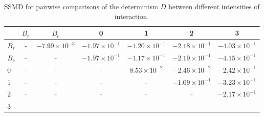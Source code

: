 \begin{table}
\centering
\caption{SSMD for pairwise comparisons of the determinism $D$ between different intensities of interaction.}
\label{tab:ssmd_determinism}
\begin{tabular}{lcccccc}
\toprule
 & $B_r$ & $B_c$ & 0 & 1 & 2 & 3 \\
\midrule
$B_r$ & - & $-7.99 \times 10^{-3}$ & $-1.97 \times 10^{-1}$ & $-1.20 \times 10^{-1}$ & $-2.18 \times 10^{-1}$ & $-4.03 \times 10^{-1}$ \\
$B_c$ & - & - & $-1.97 \times 10^{-1}$ & $-1.17 \times 10^{-1}$ & $-2.19 \times 10^{-1}$ & $-4.15 \times 10^{-1}$ \\
0 & - & - & - & $8.53 \times 10^{-2}$ & $-2.46 \times 10^{-2}$ & $-2.42 \times 10^{-1}$ \\
1 & - & - & - & - & $-1.09 \times 10^{-1}$ & $-3.23 \times 10^{-1}$ \\
2 & - & - & - & - & - & $-2.17 \times 10^{-1}$ \\
3 & - & - & - & - & - & - \\
\bottomrule
\end{tabular}
\end{table}
